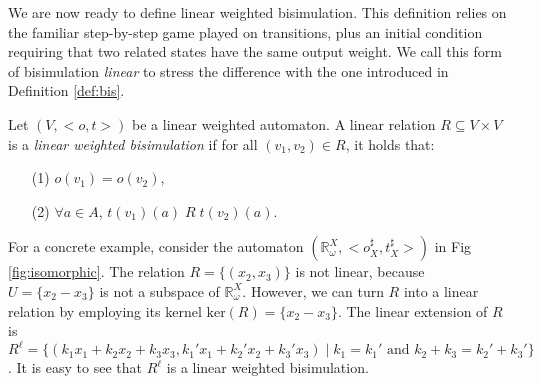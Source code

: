 \documentclass[3p]{elsarticle}
\newcommand{\cbox}[1]{\vspace{0.2cm}\noindent
  \fbox{\parbox{.97\textwidth}{#1}}\vspace{0.2cm}}
\newcommand{\fL}{\mathcal{L}}    %
\newcommand{\vectproduct}{\times} %
\newcommand{\kernel}{\mathrm{ker}} %
\newcommand{\lwa}{{\sc lwa}}           %
\newtheorem{lemma}{Lemma}
\begin{document}
We are now ready to define linear weighted bisimulation. This
definition relies on the familiar step-by-step game played   on
transitions, plus an initial condition requiring that two related
states have the same output weight. We call this form of
bisimulation \emph{linear} to stress the difference with the one
introduced in Definition \ref{def:bis}.

\begin{definition}\label{Def:Bis}
Let $(V, <o,t>)$ be a linear weighted automaton. A linear relation
$R\subseteq V \vectproduct V$ is a \emph{linear weighted
bisimulation} if for all $(v_1,v_2)\in R$, it holds that:
\begin{enumerate}
\item[(1)] $o(v_1)=o(v_2)$,
\item[(2)] $\forall a\in A$, $t(v_1)(a)\; R \;t(v_2)(a)$.
\end{enumerate}
\end{definition}
%


For a concrete example, consider the automaton
$(\mathbb{R}_{\omega}^X, <o_X^\sharp,t_X^\sharp>)$ in Fig
\ref{fig:isomorphic}. The relation $R=\{(x_2,x_3)\}$ is not linear,
because $U=\{x_2-x_3\}$ is not a subspace of
$\mathbb{R}_{\omega}^X$. However, we can turn $R$ into a linear
relation by employing its kernel $\kernel(R)=\{x_2-x_3\}$. The
linear extension of $R$ is $R^\ell=\{(k_1x_1 + k_2x_2 + k_3x_3,
k_1'x_1 + k_2'x_2 + k_3'x_3) \;|\; k_1=k_1' \text{ and }
k_2+k_3=k_2'+k_3' \}$. It is easy to see that $R^\ell$ is a linear
weighted bisimulation.

%
%
\end{document}
